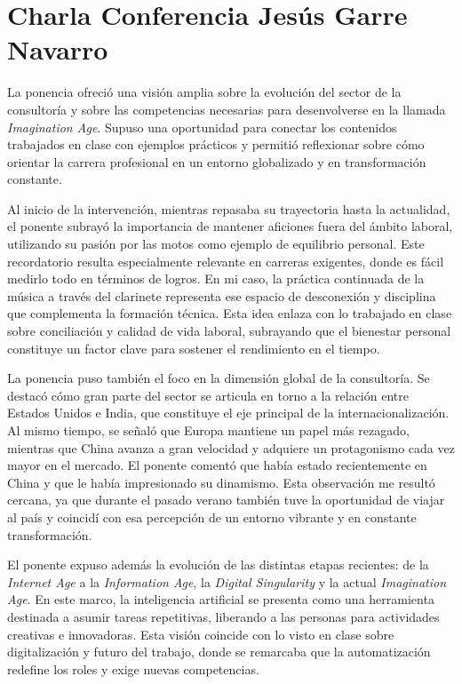 \chapter{Charla Conferencia Jesús Garre Navarro}

La ponencia ofreció una visión amplia sobre la evolución del sector de la consultoría y sobre las competencias necesarias para desenvolverse en la llamada \emph{Imagination Age}. Supuso una oportunidad para conectar los contenidos trabajados en clase con ejemplos prácticos y permitió reflexionar sobre cómo orientar la carrera profesional en un entorno globalizado y en transformación constante.  

Al inicio de la intervención, mientras repasaba su trayectoria hasta la actualidad, el ponente subrayó la importancia de mantener aficiones fuera del ámbito laboral, utilizando su pasión por las motos como ejemplo de equilibrio personal. Este recordatorio resulta especialmente relevante en carreras exigentes, donde es fácil medirlo todo en términos de logros. En mi caso, la práctica continuada de la música a través del clarinete representa ese espacio de desconexión y disciplina que complementa la formación técnica. Esta idea enlaza con lo trabajado en clase sobre conciliación y calidad de vida laboral, subrayando que el bienestar personal constituye un factor clave para sostener el rendimiento en el tiempo.  

La ponencia puso también el foco en la dimensión global de la consultoría. Se destacó cómo gran parte del sector se articula en torno a la relación entre Estados Unidos e India, que constituye el eje principal de la internacionalización. Al mismo tiempo, se señaló que Europa mantiene un papel más rezagado, mientras que China avanza a gran velocidad y adquiere un protagonismo cada vez mayor en el mercado. El ponente comentó que había estado recientemente en China y que le había impresionado su dinamismo. Esta observación me resultó cercana, ya que durante el pasado verano también tuve la oportunidad de viajar al país y coincidí con esa percepción de un entorno vibrante y en constante transformación.  

El ponente expuso además la evolución de las distintas etapas recientes: de la \emph{Internet Age} a la \emph{Information Age}, la \emph{Digital Singularity} y la actual \emph{Imagination Age}. En este marco, la inteligencia artificial se presenta como una herramienta destinada a asumir tareas repetitivas, liberando a las personas para actividades creativas e innovadoras. Esta visión coincide con lo visto en clase sobre digitalización y futuro del trabajo, donde se remarcaba que la automatización redefine los roles y exige nuevas competencias.  


